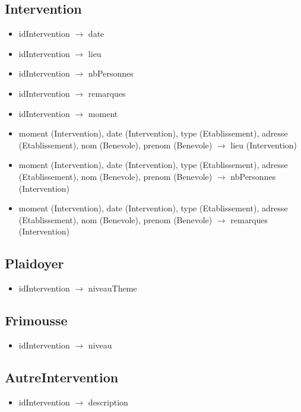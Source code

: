 \documentclass[asi, sansVersion]{picInsa}
\begin{document}
\subsection*{Intervention}
\begin{itemize}
\item[]	idIntervention $\rightarrow$ date
\item[]	idIntervention $\rightarrow$ lieu
\item[]	idIntervention $\rightarrow$ nbPersonnes
\item[]	idIntervention $\rightarrow$ remarques
\item[]	idIntervention $\rightarrow$ moment
\item[] moment (Intervention), date (Intervention), type (Etablissement), adresse (Etablissement), nom (Benevole), prenom (Benevole) $\rightarrow$ lieu (Intervention)
\item[] moment (Intervention), date (Intervention), type (Etablissement), adresse (Etablissement), nom (Benevole), prenom (Benevole) $\rightarrow$ nbPersonnes (Intervention)
\item[] moment (Intervention), date (Intervention), type (Etablissement), adresse (Etablissement), nom (Benevole), prenom (Benevole) $\rightarrow$ remarques (Intervention)
\end{itemize}

\subsection*{Plaidoyer}
\begin{itemize}
\item[]	idIntervention $\rightarrow$ niveauTheme
\end{itemize}

\subsection*{Frimousse}
\begin{itemize}
\item[] idIntervention $\rightarrow$ niveau
\end{itemize}

\subsection*{AutreIntervention}
\begin{itemize}
\item[] idIntervention $\rightarrow$ description
\end{itemize}
\end{document}
